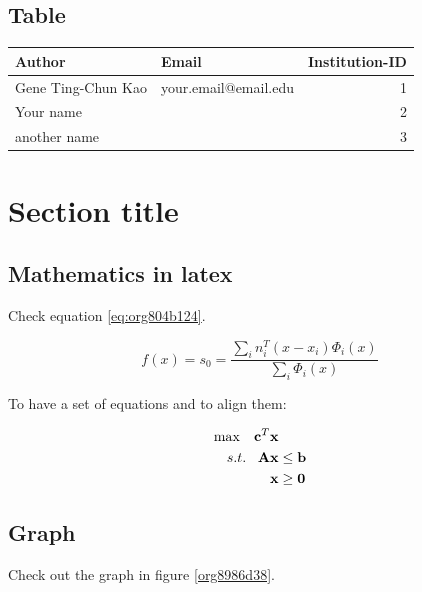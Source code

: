 \documentclass[a4paper,11pt]{article}
\begin{document}
\subsection*{Table}
\label{sec:orgd5eadb3}

\begin{center}
\begin{tabular}{llr}
Author & Email & Institution-ID\\
\hline
Gene Ting-Chun Kao & your.email@email.edu & 1\\
Your name &  & 2\\
another name &  & 3\\
\end{tabular}
\end{center}



\section*{Section title}
\label{sec:orgc3e2a8a}

\subsection*{Mathematics in latex}
\label{sec:orgb0bf0de}

Check equation \ref{eq:org804b124}.

\begin{equation}
\label{eq:org804b124}
f(x) = {s_0} = \frac{{\sum\limits_i {n_i^T(x - {x_i}){\Phi _i}(x)} }}{{\sum\limits_i {{\Phi _i}(x)} }}
\end{equation}

To have a set of equations and to align them:

\begin{equation}
\begin{array}{l}
\begin{split}
\max \;\;\; {{\bf{c}}^T}{\bf{x}} & \\
s.t. \;\;\; {\bf{Ax}} & \le {\bf{b}} \\
{\bf{x}} & \ge {\bf{0}}
\end{split}
\end{array}
\end{equation}

\subsection*{Graph}
\label{sec:org7b6caa4}

Check out the graph in figure \ref{org8986d38}.
\end{document}
